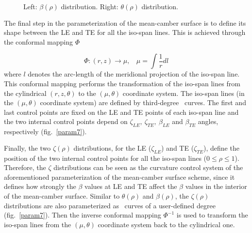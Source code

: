 \begin{figure}[h!]
\begin{minipage}[b]{1\linewidth}
 \centering
\end{minipage}
\caption{Left: $\beta(\rho)$ distribution. Right: $\theta(\rho)$ distribution.}
\label{param4}
\end{figure}

The final step in the parameterization of the mean-camber surface is to define its shape between the LE and TE for all the iso-span lines. This is achieved through the conformal mapping $\Phi$


\begin{equation} 
   \Phi:(r,z)\rightarrow \mu, ~~~~\mu=\int{\frac{1}{r}dl}
   \label{phi1} 
\end{equation}
where $l$ denotes the arc-length of the meridional projection of the iso-span line. This conformal mapping performs the transformation of the iso-span lines from the cylindrical  $(r,z,\theta)$ to the $(\mu,\theta)$ coordinate system. The iso-span lines (in the $(\mu,\theta)$ coordinate system) are defined by third-degree \Bezier\ curves. The first and last control points are fixed on the LE and TE points of each iso-span line and the two internal control points depend on $\zeta_{LE}, ~\zeta_{TE}, ~\beta_{LE}$ and $\beta_{TE}$ angles, respectively (fig.\ \ref{param7}).
  
Finally, the two $\zeta(\rho)$ distributions, for the LE ($\zeta_{LE}$) and TE ($\zeta_{TE}$), define the position of the two internal control points for all the iso-span lines ($0\leq\rho\leq1$). Therefore, the $\zeta$ distributions can be seen as the curvature control system of the aforementioned parameterization of the mean-camber surface scheme, since it defines how strongly the $\beta$ values at LE and TE affect the $\beta$ values in the interior of the mean-camber surface. Similar to $\theta(\rho)$ and $\beta(\rho)$, the $\zeta(\rho)$ distributions are also parameterized as \Bezier\ curves of a user-defined degree (fig.\ \ref{param7}). Then the  inverse conformal mapping $\Phi^{-1}$ is used to transform the iso-span lines from the $(\mu,\theta)$ coordinate system back to the cylindrical one. 

